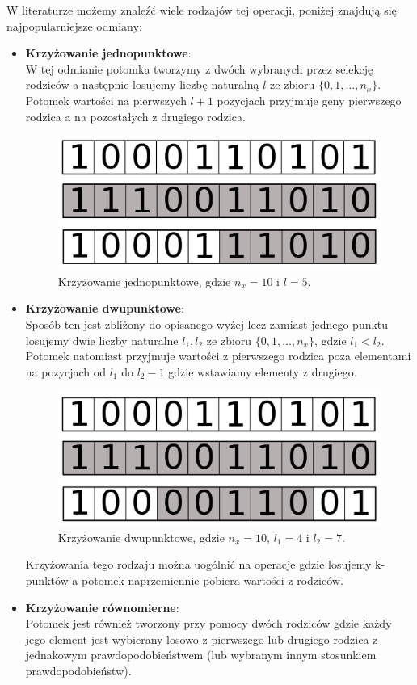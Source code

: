 \documentclass{article}
\begin{document}
W literaturze możemy znaleźć wiele rodzajów tej operacji, poniżej znajdują się najpopularniejsze
odmiany:
\begin{itemize}
\item \textbf{Krzyżowanie jednopunktowe}:\\
W tej odmianie potomka tworzymy z dwóch wybranych przez selekcję rodziców a następnie 
losujemy liczbę naturalną  $l$ ze zbioru $\{0,1,\ldots, n_x\}$.
Potomek wartości na pierwszych $l+1$ pozycjach przyjmuje geny pierwszego rodzica
a na pozostałych z drugiego rodzica.
\begin{figure}[H]
\centering
\includegraphics[scale=0.2]{crossover_v2.png}
\caption{Krzyżowanie jednopunktowe, gdzie $n_x = 10$ i $l = 5$.}
\end{figure}

\item \textbf{Krzyżowanie dwupunktowe}:\\
Sposób ten jest zbliżony do opisanego wyżej lecz zamiast jednego punktu losujemy dwie liczby
naturalne $l_1, l_2$ ze zbioru $\{0,1,\ldots, n_x\}$, gdzie $l_1 < l_2$.
Potomek natomiast przyjmuje wartości z pierwszego rodzica poza elementami na pozycjach od
$l_1$ do $l_2 - 1$ gdzie wstawiamy elementy z drugiego.

\begin{figure}[H]
\centering
\includegraphics[scale=0.2]{two_crossover_v2.png}
\caption{Krzyżowanie dwupunktowe, gdzie $n_x = 10$, $l_1 = 4$ i $l_2 = 7$.}
\end{figure}

Krzyżowania tego rodzaju można uogólnić na operacje gdzie losujemy k-punktów
a potomek naprzemiennie pobiera wartości z rodziców.\\
\item \textbf{Krzyżowanie równomierne}:\\
Potomek jest również tworzony przy pomocy dwóch rodziców gdzie każdy jego element jest
wybierany losowo z pierwszego lub drugiego rodzica z jednakowym prawdopodobieństwem 
(lub wybranym innym stosunkiem prawdopodobieństw).

\end{itemize}
\end{document}
